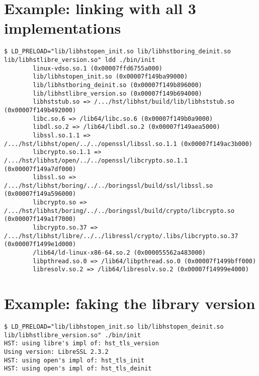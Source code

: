 \documentclass[12pt,oneside]{report}
\begin{document}
\section{Example: linking with all 3 implementations}\label{app:linkwithimpl}

\begin{tiny}
\begin{verbatim}
$ LD_PRELOAD="lib/libhstopen_init.so lib/libhstboring_deinit.so lib/libhstlibre_version.so" ldd ./bin/init
        linux-vdso.so.1 (0x00007ffd6755a000)
        lib/libhstopen_init.so (0x00007f149ba99000)
        lib/libhstboring_deinit.so (0x00007f149b896000)
        lib/libhstlibre_version.so (0x00007f149b694000)
        libhststub.so => /.../hst/libhst/build/lib/libhststub.so (0x00007f149b492000)
        libc.so.6 => /lib64/libc.so.6 (0x00007f149b0a9000)
        libdl.so.2 => /lib64/libdl.so.2 (0x00007f149aea5000)
        libssl.so.1.1 => /.../hst/libhst/open/../../openssl/libssl.so.1.1 (0x00007f149ac3b000)
        libcrypto.so.1.1 => /.../hst/libhst/open/../../openssl/libcrypto.so.1.1 (0x00007f149a7df000)
        libssl.so => /.../hst/libhst/boring/../../boringssl/build/ssl/libssl.so (0x00007f149a596000)
        libcrypto.so => /.../hst/libhst/boring/../../boringssl/build/crypto/libcrypto.so (0x00007f149a1f7000)
        libcrypto.so.37 => /.../hst/libhst/libre/../../libressl/crypto/.libs/libcrypto.so.37 (0x00007f1499e1d000)
        /lib64/ld-linux-x86-64.so.2 (0x000055562a483000)
        libpthread.so.0 => /lib64/libpthread.so.0 (0x00007f1499bff000)
        libresolv.so.2 => /lib64/libresolv.so.2 (0x00007f14999e4000)
\end{verbatim}
\end{tiny}

\newpage

\section{Example: faking the library version}\label{app:fakeversion}

\begin{tiny}
\begin{verbatim}
$ LD_PRELOAD="lib/libhstopen_init.so lib/libhstopen_deinit.so lib/libhstlibre_version.so" ./bin/init
HST: using libre's impl of: hst_tls_version
Using version: LibreSSL 2.3.2
HST: using open's impl of: hst_tls_init
HST: using open's impl of: hst_tls_deinit
\end{verbatim}
\end{tiny}

\newpage
\end{document}

